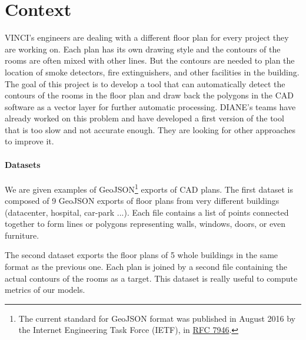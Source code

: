 \documentclass[11pt]{article}
\begin{document}

\section{Context}
VINCI's engineers are dealing with a different floor plan for every project they are working on.
Each plan has its own drawing style and the contours of the rooms are often mixed with other
lines. But the contours are needed to plan the location of smoke detectors, fire extinguishers,
and other facilities in the building. The goal of this project is to develop a tool that can
automatically detect the contours of the rooms in the floor plan and draw back the polygons in the CAD software as 
a vector layer for further automatic processing. 
DIANE's teams have already worked on this problem and have developed a first version of the tool
that is too slow and not accurate enough. They are looking for other approaches
to improve it.

\paragraph{Datasets}
We are given examples of GeoJSON\footnote{The current standard for GeoJSON format was 
published in August 2016 by the Internet Engineering Task Force (IETF), 
in \href{https://datatracker.ietf.org/doc/html/rfc7946}{RFC 7946}.} exports of CAD plans. The first dataset is 
composed of 9 GeoJSON exports of floor plans from very different buildings (datacenter, 
hospital, car-park ...). Each file contains a list of points 
connected together to form lines or polygons representing walls, windows, doors, 
or even furniture.

The second dataset exports the floor plans of 5 whole buildings in the same format
as the previous one. Each plan is joined by a second file 
containing the actual contours of the rooms as a target. This dataset is really useful 
to compute metrics of our models.

\end{document}
